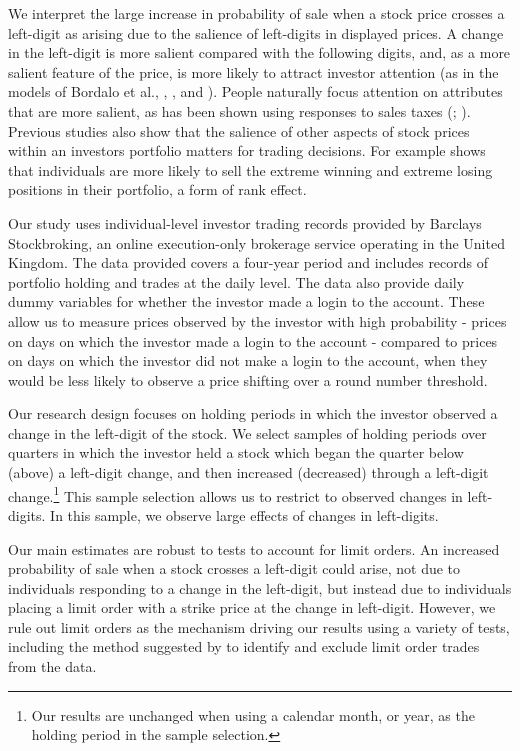 We interpret the large increase in probability of sale when a stock price crosses a left-digit as arising due to the salience of left-digits in displayed prices. A change in the left-digit is more salient compared with the following digits, and, as a more salient feature of the price, is more likely to attract investor attention (as in the models of Bordalo et al.,  \citeyear{bordalo2012salience, bordalo2013salience}, \citealp{ kHoszegi2013model}, and \citealp{bushong2015model}). People naturally focus attention on attributes that are more salient, as has been shown using responses to sales taxes (\citealp{chetty2009salience}; \citealp{finkelstein2009ztax}). Previous studies also show that the salience of other aspects of stock prices within an investors portfolio matters for trading decisions. For example \cite{hartzmark2015} shows that individuals are more likely to sell the extreme winning and extreme losing positions in their portfolio, a form of rank effect. 

Our study uses individual-level investor trading records provided by Barclays Stockbroking, an online execution-only brokerage service operating in the United Kingdom. The data provided covers a four-year period and includes records of portfolio holding and trades at the daily level. The data also provide daily dummy variables for whether the investor made a login to the account. These allow us to measure prices observed by the investor with high probability - prices on days on which the investor made a login to the account - compared to prices on days on which the investor did not make a login to the account, when they would be less likely to observe a price shifting over a round number threshold.

Our research design focuses on holding periods in which the investor observed a change in the left-digit of the stock. We select samples of holding periods over quarters in which the investor held a stock which began the quarter below (above) a left-digit change, and then increased (decreased) through a left-digit change.\footnote{Our results are unchanged when using a calendar month, or year, as the holding period in the sample selection.} This sample selection allows us to restrict to observed changes in left-digits. In this sample, we observe large effects of changes in left-digits.

Our main estimates are robust to tests to account for limit orders. An increased probability of sale when a stock crosses a left-digit could arise, not due to individuals responding to a change in the left-digit, but instead due to individuals placing a limit order with a strike price at the change in left-digit. However, we rule out limit orders as the mechanism driving our results using a variety of tests, including the method suggested by \cite{linnainmaa2010limit} to identify and exclude limit order trades from the data. 

